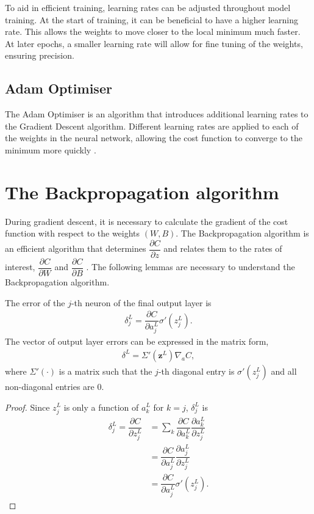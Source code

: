 To aid in efficient training, learning rates can be adjusted throughout model training. At the start of training, it can be beneficial to have a higher learning rate. This allows the weights to move closer to the local minimum much faster. At later epochs, a smaller learning rate will allow for fine tuning of the weights, ensuring precision.

\subsection*{Adam Optimiser}\label{nnets-adam}

The Adam Optimiser is an algorithm that introduces additional learning rates to the Gradient Descent algorithm. Different learning rates are applied to each of the weights in the neural network, allowing the cost function to converge to the minimum more quickly \citep{Kingma2014}.


\section{The Backpropagation algorithm}\label{nnets-backprop}

During gradient descent, it is necessary to calculate the gradient of the cost function with respect to the weights $(W,B)$. The Backpropagation algorithm is an efficient algorithm that determines $\dfrac{\partial C}{\partial z}$ and relates them to the rates of interest, $\dfrac{\partial C}{\partial W}$ and $\dfrac{\partial C}{\partial B}$ \citep{Nielson2015}. The following lemmas are necessary to understand the Backpropagation algorithm.


\begin{lemma}
	The error of the $j$-th neuron of the final output layer is
	\begin{align}
		\delta_j^L = \dfrac{\partial C}{\partial a_j^L}\sigma'(z_j^L).
	\end{align}
	The vector of output layer errors can be expressed in the matrix form,
	\begin{align}\label{nnets-bprop-eq1}
		\delta^L = \Sigma'(\mathbf{z}^L)\nabla_aC,
	\end{align}
where $\Sigma'(\cdot)$ is a matrix such that the $j$-th diagonal entry is $\sigma'(z_j^L)$ and all non-diagonal entries are 0.
\end{lemma}

\begin{proof}

Since $z_j^L$ is only a function of $a_k^L$ for $k = j$, $\delta_j^L$ is
	\begin{align}
		\delta_j^L = \dfrac{\partial C}{\partial z_j^L} & = \sum_k\dfrac{\partial C}{\partial a_k^L}\dfrac{\partial a_k^L}{\partial z_j^L} \\
		& = \dfrac{\partial C}{\partial a_j^L}\dfrac{\partial a_j^L}{\partial z_j^L}\\
		& = \dfrac{\partial C}{\partial a_j^L}\sigma'(z_j^L).
	\end{align}
\end{proof}

